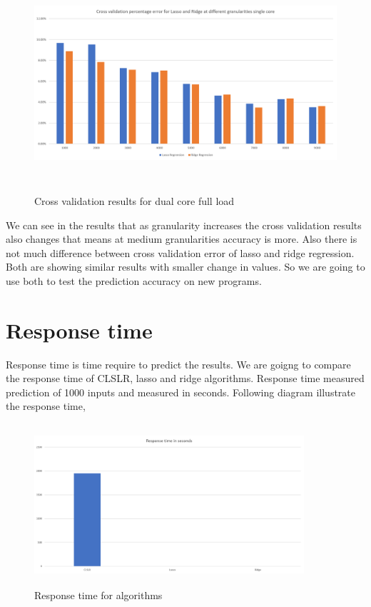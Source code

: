 \begin{figure}[h!]
\includegraphics[width=12cm, height=8cm]{./images/CV_single_core}
\centering
\caption{Cross validation results for dual core full load}
\label{fig:training}
\end{figure}

\par We can see in the results that as granularity increases the cross validation results also changes that means at medium granularities accuracy is more. Also there is not much difference between cross validation error of lasso and ridge regression. Both are showing similar results with smaller change in values.  So we are going to use both  to test the prediction accuracy on new programs. 

\section{Response time}
Response time is time require to predict the results. We are goigng to compare the response time of CLSLR, lasso and ridge algorithms. Response time measured prediction of 1000 inputs and measured in seconds.  Following diagram illustrate the response time, 
\begin{figure}[h!]
\includegraphics[width=10cm, height=6cm]{./images/response}
\centering
\caption{Response time for algorithms}
\label{fig:training}
\end{figure}

